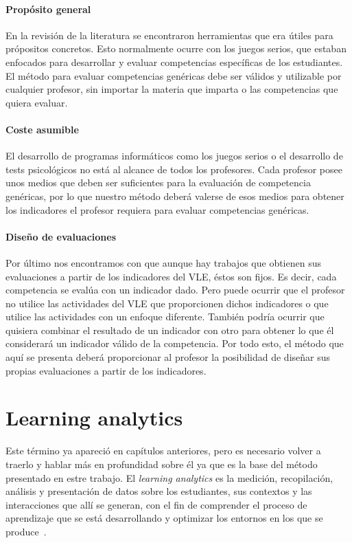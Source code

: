 \paragraph*{Propósito general}

En la revisión de la literatura se encontraron herramientas que era útiles para própositos concretos. Esto normalmente ocurre con los juegos serios, que estaban enfocados para desarrollar y evaluar competencias específicas de los estudiantes. El método para evaluar competencias genéricas debe ser válidos y utilizable por cualquier profesor, sin importar la materia que imparta o las competencias que quiera evaluar. 

\paragraph*{Coste asumible}

El desarrollo de programas informáticos como los juegos serios o el desarrollo de tests psicológicos no está al alcance de todos los profesores. Cada profesor posee unos medios que deben ser suficientes para la evaluación de competencia genéricas, por lo que nuestro método deberá valerse de esos medios para obtener los indicadores el profesor requiera para evaluar competencias genéricas.

\paragraph*{Diseño de evaluaciones}

Por último nos encontramos con que aunque hay trabajos que obtienen sus evaluaciones a partir de los indicadores del VLE, éstos son fijos. Es decir, cada competencia se evalúa con un indicador dado. Pero puede ocurrir que el profesor no utilice las actividades del VLE que proporcionen dichos indicadores o que utilice las actividades con un enfoque diferente. También podría ocurrir que quisiera combinar el resultado de un indicador con otro para obtener lo que él considerará un indicador válido de la competencia. Por todo esto, el método que aquí se presenta deberá proporcionar al profesor la posibilidad de diseñar sus propias evaluaciones a partir de los indicadores.


\section{Learning analytics}

Este término ya apareció en capítulos anteriores, pero es necesario volver a traerlo y hablar más en profundidad sobre él ya que es la base del método presentado en estre trabajo. El \emph{learning analytics} es la medición, recopilación, análisis y presentación de datos sobre los estudiantes, sus contextos y las interacciones que allí se generan, con el fin de comprender el proceso de aprendizaje que se está desarrollando y optimizar los entornos en los que se produce~\cite{siemens2012learning}.



